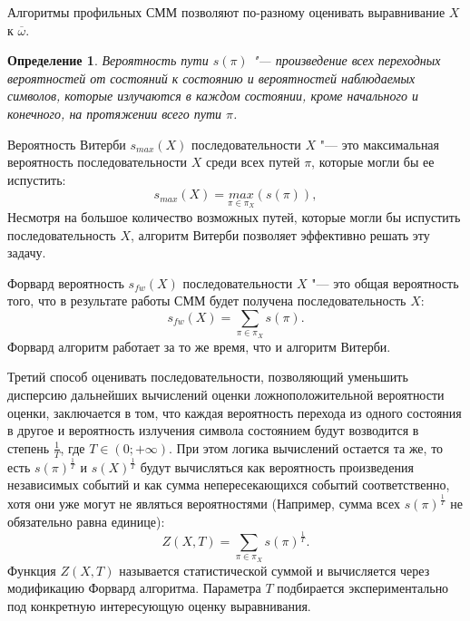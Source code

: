 \documentclass[specialist,
substylefile = spbu_report.rtx,
subf,href,colorlinks=true, 12pt]{disser}
\newtheorem{defenition}{Определение}
\begin{document}
				Алгоритмы профильных СММ позволяют по-разному оценивать выравнивание $X$ к $\overline{\omega}$. 
				
				\begin{defenition}
					Вероятность пути $s(\pi)$ "--- произведение всех переходных вероятностей от состояний к состоянию и вероятностей наблюдаемых символов, которые излучаются в каждом состоянии, кроме начального и конечного, на протяжении всего пути $\pi$. 
				\end{defenition}
				
				Вероятность Витерби $s_{max}(X)$ последовательности $X$ "--- это максимальная вероятность последовательности $X$ среди всех путей $\pi$, которые могли бы ее испустить:
				\begin{equation*}
					s_{max}(X) = \underset{\pi \in \pi_{X}}{max}(s(\pi)),
				\end{equation*}
				Несмотря на большое количество возможных путей, которые могли бы испустить последовательность $X$, алгоритм Витерби позволяет эффективно решать эту задачу.
				
				Форвард вероятность $s_{fw}(X)$ последовательности $X$ "--- это общая вероятность того, что в результате работы СММ будет получена последовательность $X$:
				\begin{equation*}
					s_{fw}(X) = \sum_{\pi \in \pi_{X}}s(\pi).
				\end{equation*}		
				Форвард алгоритм работает за то же время, что и алгоритм Витерби.
				
				Третий способ оценивать последовательности, позволяющий уменьшить дисперсию дальнейших вычислений оценки ложноположительной вероятности оценки, заключается в том, что каждая вероятность перехода из одного состояния в другое и вероятность излучения символа состоянием будут возводится в степень $\frac{1}{T}$, где $T \in (0; +\infty)$. При этом логика вычислений остается та же, то есть $s(\pi)^{\frac{1}{T}}$ и $s(X)^{\frac{1}{T}}$ будут вычисляться как вероятность произведения независимых событий и как сумма непересекающихся событий соответственно, хотя они уже могут не являться вероятностями (Например, сумма всех $s(\pi)^\frac{1}{T}$ не обязательно равна единице):
				\begin{equation*}
					Z(X, T)	= \sum_{\pi \in \pi_{X}}s(\pi)^{\frac{1}{T}}.
				\end{equation*}		
				Функция $Z(X, T)$ называется статистической суммой и вычисляется через модификацию Форвард алгоритма. Параметра $T$ подбирается экспериментально под конкретную интересующую оценку выравнивания.
\end{document}

